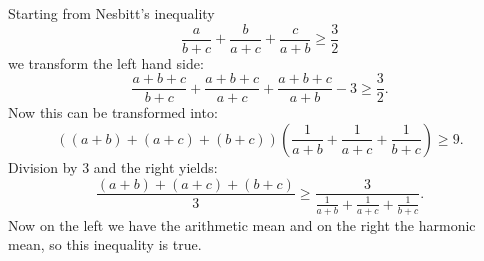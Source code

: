 \documentclass[12pt]{article}
\begin{document}
Starting from Nesbitt's inequality
$$\frac{a}{b+c}+\frac{b}{a+c}+\frac{c}{a+b}\geq\frac{3}{2}$$
we transform the left hand side:
$$\frac{a+b+c}{b+c}+\frac{a+b+c}{a+c}+\frac{a+b+c}{a+b}-3\geq\frac{3}{2}.$$
Now this can be transformed into:
$$((a+b)+(a+c)+(b+c))\left(\frac{1}{a+b}+\frac{1}{a+c}+\frac{1}{b+c}\right)\geq 9.$$
Division by 3 and the right  yields:
$$\frac{(a+b)+(a+c)+(b+c)}{3}\geq\frac{3}{\frac{1}{a+b}+\frac{1}{a+c}+ \frac{1}{b+c}}.$$
Now on the left we have the arithmetic mean and on the right the harmonic mean, so this inequality is true.
\end{document}
